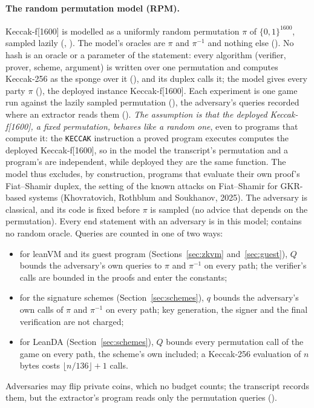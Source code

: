 \documentclass[11pt]{article}
\begin{document}
\paragraph{The random permutation model (RPM).} Keccak-f[1600] is modelled as a uniformly random
permutation $\pi$ of $\{0,1\}^{1600}$, sampled lazily (,
). The model's oracles are $\pi$ and $\pi^{-1}$ and
nothing else (). No hash is an oracle or a parameter of
the statement: every algorithm (verifier, prover, scheme, argument) is written over one
permutation and computes Keccak-256 as the sponge over it (), and its duplex
calls it; the model gives every party $\pi$ (), the deployed
instance Keccak-f[1600]. Each experiment is one game run against the lazily sampled permutation
(), the adversary's queries recorded where an extractor reads
them (). \emph{The assumption is that the
deployed Keccak-f[1600], a fixed permutation, behaves like a random one}, even to programs that
compute it: the \texttt{KECCAK} instruction a proved program executes computes the deployed
Keccak-f[1600], so in the model the transcript's permutation and a program's are independent,
while deployed they are the same function. The model thus excludes, by construction, programs that
evaluate their own proof's Fiat--Shamir duplex, the setting of the known attacks on Fiat--Shamir
for GKR-based systems (Khovratovich, Rothblum and Soukhanov, 2025). The adversary is classical,
and its code is fixed before $\pi$ is sampled (no advice that depends on the permutation). Every end statement with
an adversary is in this model;  contains no random oracle. Queries are counted in
one of two ways:
\begin{itemize}
\item for leanVM and its guest program (Sections~\ref{sec:zkvm} and~\ref{sec:guest}), $Q$ bounds
the adversary's own queries to $\pi$ and $\pi^{-1}$ on every path; the verifier's calls are bounded
in the proofs and enter the constants;
\item for the signature schemes (Section~\ref{sec:schemes}), $q$ bounds the adversary's own calls
of $\pi$ and $\pi^{-1}$ on every path; key generation, the signer and the final verification are
not charged;
\item for LeanDA (Section~\ref{sec:schemes}), $Q$ bounds every permutation call of the game on
every path, the scheme's own included; a Keccak-256 evaluation of $n$ bytes costs
$\lfloor n/136\rfloor + 1$ calls.
\end{itemize}
Adversaries may flip private coins, which no budget counts; the transcript records them, but the extractor's program reads only the permutation queries ().
\end{document}
